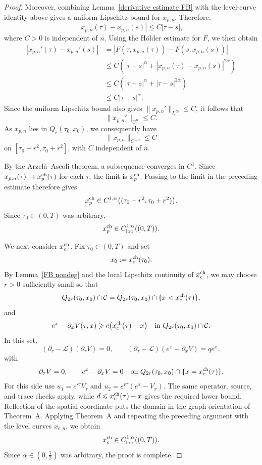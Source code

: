 \documentclass[11pt, a4paper, leqno]{amsart}
\numberwithin{equation}{section}
\theoremstyle{plain}
\theoremstyle{definition}
\theoremstyle{remark}
\def\leq{\leqslant}
\def\geq{\geqslant}
\begin{document}
{\begin{proof}
Moreover, combining Lemma~\ref{derivative estimate FB} with the
level-curve identity above gives a uniform Lipschitz bound for
$x_{p,n}$. Therefore,
\[
    |x_{p,n}(\tau)-x_{p,n}(s)|
    \leq C|\tau-s|,
\]
where $C>0$ is independent of $n$. Using the H\"older estimate for
$F$, we then obtain
\[
\begin{aligned}
    |x_{p,n}'(\tau)-x_{p,n}'(s)|
    &=
    \left|
        F(\tau,x_{p,n}(\tau))
        -F(s,x_{p,n}(s))
    \right| \\
    &\leq
    C\left(
        |\tau-s|^\alpha
        +|x_{p,n}(\tau)-x_{p,n}(s)|^{2\alpha}
    \right) \\
    &\leq
    C\left(
        |\tau-s|^\alpha+|\tau-s|^{2\alpha}
    \right) \\
    &\leq
    C|\tau-s|^\alpha.
\end{aligned}
\]
Since the uniform Lipschitz bound also gives
$\|x_{p,n}'\|_{L^\infty}\leq C$, it follows that
\[
    \|x_{p,n}'\|_{C^\alpha}\leq C.
\]
As $x_{p,n}$ lies in $Q_r(\tau_0,x_0)$, we consequently have
\[
    \|x_{p,n}\|_{C^{1,\alpha}}\leq C
\]
on $[\tau_0-r^2,\tau_0+r^2]$, with $C$ independent of $n$.

By the Arzel\`a--Ascoli theorem, a subsequence converges in $C^1$.
Since $x_{p,n}(\tau)\to x_p^{\rm ch}(\tau)$ for each $\tau$, the limit
is $x_p^{\rm ch}$. Passing to the limit in the preceding estimate
therefore gives
\[
    x_p^{\rm ch}\in C^{1,\alpha}
    \bigl((\tau_0-r^2,\tau_0+r^2)\bigr).
\]
Since $\tau_0\in(0,T)$ was arbitrary,
\[
    x_p^{\rm ch}\in C_{\rm loc}^{1,\alpha}((0,T)).
\]

We next consider $x_c^{\rm ch}$.
Fix $\tau_0\in(0,T)$ and set
\[
    x_0:=x_c^{\rm ch}(\tau_0).
\]
By Lemma~\ref{FB nondeg} and the local Lipschitz continuity of
$x_c^{\rm ch}$, we may choose $r>0$ sufficiently small so that
\[
    Q_{2r}(\tau_0,x_0)\cap\mathcal C
    =
    Q_{2r}(\tau_0,x_0)\cap\{x<x_c^{\rm ch}(\tau)\},
\]
and
\[
    e^x-\partial_xV(\tau,x)
    \geq
    c\bigl(x_c^{\rm ch}(\tau)-x\bigr)
    \quad\text{in }
    Q_{2r}(\tau_0,x_0)\cap\mathcal C.
\]
In this set,
\[
    (\partial_\tau-\mathcal L)(\partial_\tau V)=0,
    \qquad
    (\partial_\tau-\mathcal L)(e^x-\partial_xV)=qe^x,
\]
with
\[
    \partial_\tau V=0,
    \qquad
    e^x-\partial_xV=0
    \quad\text{on }
    Q_{2r}(\tau_0,x_0)\cap\{x=x_c^{\rm ch}(\tau)\}.
\]
{
For this side use $u_1=e^{r\tau}V_\tau$ and
$u_2=e^{r\tau}(e^x-V_x)$. The same operator, source, and trace
checks apply, while $d\leq x_c^{\rm ch}(\tau)-x$ gives the
required lower bound. Reflection of the spatial coordinate puts the
domain in the graph orientation of Theorem~A.
} Applying Theorem~A and repeating the preceding argument with the
level curves $x_{c,n}$, we obtain
\[
    x_c^{\rm ch}\in C_{\rm loc}^{1,\alpha}((0,T)).
\]
Since $\alpha\in(0,\frac12)$ was arbitrary, the proof is complete.
\end{proof}


}
\end{document}
